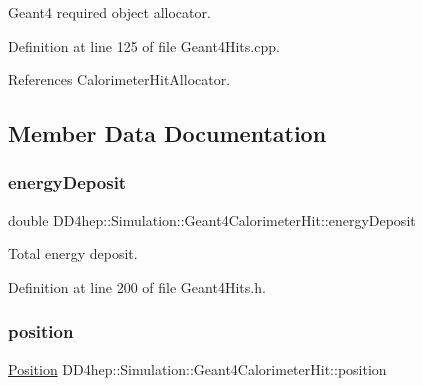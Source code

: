 Geant4 required object allocator. 



Definition at line 125 of file Geant4\+Hits.\+cpp.



References Calorimeter\+Hit\+Allocator.



\subsection{Member Data Documentation}
\hypertarget{class_d_d4hep_1_1_simulation_1_1_geant4_calorimeter_hit_ae597e191f120cea7585fec73ddae48e9}{}\label{class_d_d4hep_1_1_simulation_1_1_geant4_calorimeter_hit_ae597e191f120cea7585fec73ddae48e9} 
\subsubsection{\texorpdfstring{energy\+Deposit}{energyDeposit}}
{\footnotesize\ttfamily double D\+D4hep\+::\+Simulation\+::\+Geant4\+Calorimeter\+Hit\+::energy\+Deposit}



Total energy deposit. 



Definition at line 200 of file Geant4\+Hits.\+h.

\hypertarget{class_d_d4hep_1_1_simulation_1_1_geant4_calorimeter_hit_a1e8c2c552a126d33cca2fbf15354309f}{}\label{class_d_d4hep_1_1_simulation_1_1_geant4_calorimeter_hit_a1e8c2c552a126d33cca2fbf15354309f} 
\subsubsection{\texorpdfstring{position}{position}}
{\footnotesize\ttfamily \hyperlink{namespace_d_d4hep_1_1_geometry_a55083902099d03506c6db01b80404900}{Position} D\+D4hep\+::\+Simulation\+::\+Geant4\+Calorimeter\+Hit\+::position}



